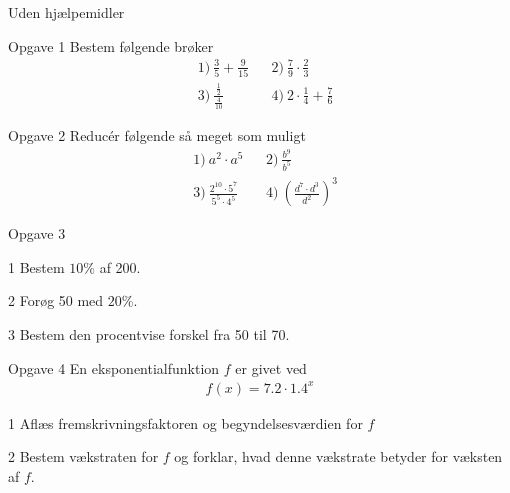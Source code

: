 \documentclass[12pt,x11names,a4paper]{article}
\begin{document}
\newpage

\begin{center}
	\LARGE
	Uden hjælpemidler
\end{center}
\begin{opgavetekst}{Opgave 1}
	Bestem følgende brøker
	\begin{align*}
		&1) \   \frac{3}{5} + \frac{9}{15}   &&2) \  \frac{7}{9}\cdot\frac{2}{3}     \\
		&3) \  \frac{\frac{1}{2}}{\frac{4}{10}}    &&4) \  2\cdot \frac{1}{4} + \frac{7}{6}    
	\end{align*}
\end{opgavetekst}

\begin{opgavetekst}{Opgave 2}
	Reducér følgende så meget som muligt
	\begin{align*}
		&1) \   a^2\cdot a^5    &&2) \ \frac{b^9}{b^5}     \\
		&3) \   \frac{2^{10}\cdot 5^7}{5^5\cdot 4^5}    &&4) \  \left(\frac{d^7\cdot d^3}{d^2}\right)^3    
	\end{align*}
\end{opgavetekst}

\begin{opgavetekst}{Opgave 3}
\end{opgavetekst}

\begin{delopgave}{}{1}
	Bestem $10\%$ af 200.
\end{delopgave}
\begin{delopgave}{}{2}
	Forøg 50 med $20\%$.
\end{delopgave}
\begin{delopgave}{}{3}
	Bestem den procentvise forskel fra 50 til 70.
\end{delopgave}


\begin{opgavetekst}{Opgave 4}
	En eksponentialfunktion $f$ er givet ved
	\begin{align*}
		f(x) = 7.2\cdot 1.4^x
	\end{align*}
\end{opgavetekst}
\begin{delopgave}{}{1}
	Aflæs fremskrivningsfaktoren og begyndelsesværdien for $f$
\end{delopgave}
\begin{delopgave}{}{2}
	Bestem vækstraten for $f$ og forklar, hvad denne vækstrate betyder for væksten af $f$. 
\end{delopgave}
\end{document}
